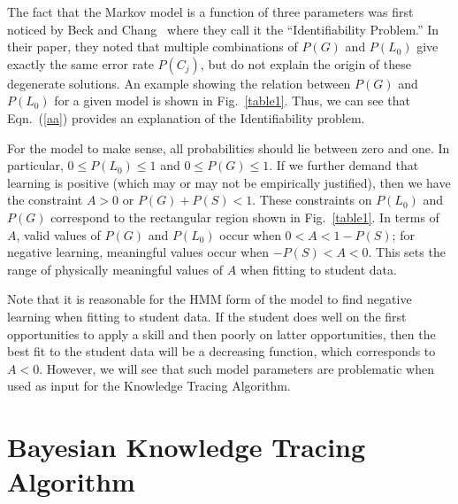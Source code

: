 \documentclass{acmlarge-edm}
\begin{document}
The fact that the Markov model is a function of three parameters
was first noticed by Beck and Chang~\citeyear{beck_identifiability:_2007} 
where they call it the ``Identifiability Problem.''   In their paper, 
they noted that multiple combinations of $P(G)$ and $P(L_0)$ give
exactly the same error rate $P(C_j)$, but do not explain the origin of 
these degenerate solutions.  An example showing the relation
between $P(G)$ and $P(L_0)$ for a given model is shown in Fig.~\ref{table1}.
Thus, we can see that Eqn.~(\ref{aa}) provides an explanation
of the Identifiability problem.

For the model to make sense, all probabilities should lie between 
zero and one.  In particular, $0\le P(L_0)\le 1$ and $0\le P(G) \le 1$.
If we further demand that learning is positive (which may or may not be
empirically justified), then we have the constraint $A>0$ or $P(G)+P(S)<1$.  
These constraints on $P(L_0)$ and $P(G)$ correspond to the rectangular
region shown in Fig.~\ref{table1}. 
In terms of $A$, valid values of $P(G)$ and $P(L_0)$ occur when
$0<A<1-P(S)$; for negative learning, meaningful values occur when
$-P(S)<A<0$.  This sets the range of physically meaningful values of
$A$ when fitting to student data.

Note that it is reasonable for the HMM form of the model to find
negative learning when fitting to student data.  If the student does
well on the first opportunities to apply a skill and then poorly on latter
opportunities, then the best fit to the student data will be a
decreasing function, which corresponds to $A<0$.  However,
we will see that such model parameters are problematic when
used as input for the Knowledge Tracing Algorithm.

\section{Bayesian Knowledge Tracing Algorithm}
\end{document}
